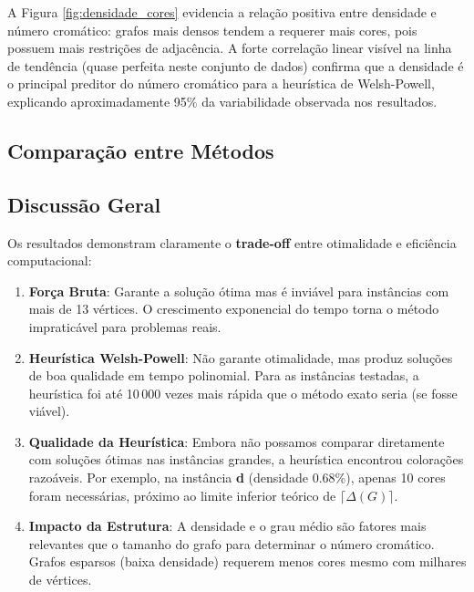 \documentclass[12pt]{article}
\begin{document}
A Figura \ref{fig:densidade_cores} evidencia a relação positiva entre densidade e número cromático: grafos mais densos tendem a requerer mais cores, pois possuem mais restrições de adjacência. A forte correlação linear visível na linha de tendência (quase perfeita neste conjunto de dados) confirma que a densidade é o principal preditor do número cromático para a heurística de Welsh-Powell, explicando aproximadamente 95\% da variabilidade observada nos resultados.

\subsection{Comparação entre Métodos}



\subsection{Discussão Geral}

Os resultados demonstram claramente o \textbf{trade-off} entre otimalidade e eficiência computacional:

\begin{enumerate}
    \item \textbf{Força Bruta}: Garante a solução ótima mas é inviável para instâncias com mais de 13 vértices. O crescimento exponencial do tempo torna o método impraticável para problemas reais.
    
    \item \textbf{Heurística Welsh-Powell}: Não garante otimalidade, mas produz soluções de boa qualidade em tempo polinomial. Para as instâncias testadas, a heurística foi até 10\,000 vezes mais rápida que o método exato seria (se fosse viável).
    
    \item \textbf{Qualidade da Heurística}: Embora não possamos comparar diretamente com soluções ótimas nas instâncias grandes, a heurística encontrou colorações razoáveis. Por exemplo, na instância \textbf{d} (densidade 0.68\%), apenas 10 cores foram necessárias, próximo ao limite inferior teórico de $\lceil \Delta(G) \rceil$.
    
    \item \textbf{Impacto da Estrutura}: A densidade e o grau médio são fatores mais relevantes que o tamanho do grafo para determinar o número cromático. Grafos esparsos (baixa densidade) requerem menos cores mesmo com milhares de vértices.
\end{enumerate}
\end{document}
